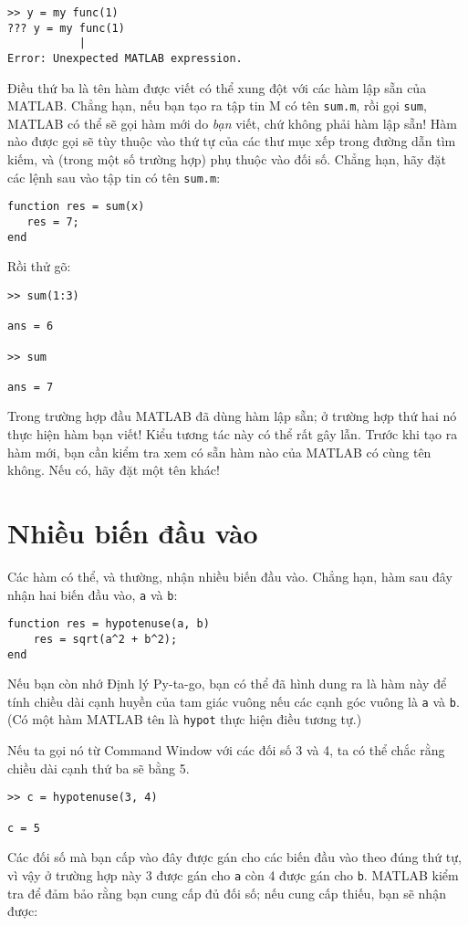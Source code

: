 \documentclass[12pt]{book}
\begin{document}
\begin{verbatim}
>> y = my func(1)
??? y = my func(1)
           |
Error: Unexpected MATLAB expression.
\end{verbatim}

Điều thứ ba là tên hàm được viết có thể xung đột với các hàm lập sẵn
của MATLAB. Chẳng hạn, nếu bạn tạo ra tập tin M có tên {\tt sum.m}, 
rồi gọi {\tt sum}, MATLAB có thể sẽ gọi hàm mới do {\em bạn} viết,
chứ không phải hàm lập sẵn! Hàm nào được gọi sẽ tùy thuộc vào thứ tự
của các thư mục xếp trong đường dẫn tìm kiếm, và (trong một số
trường hợp) phụ thuộc vào đối số. Chẳng hạn, hãy đặt các lệnh sau
vào tập tin có tên {\tt sum.m}:

\begin{verbatim}
function res = sum(x)
   res = 7;
end
\end{verbatim}

Rồi thử gõ:

\begin{verbatim}
>> sum(1:3)

ans = 6

>> sum

ans = 7
\end{verbatim}
%
Trong trường hợp đầu MATLAB đã dùng hàm lập sẵn; ở trường hợp 
thứ hai nó thực hiện hàm bạn viết! Kiểu tương tác này có thể 
rất gây lẫn. Trước khi tạo ra hàm mới, bạn cần kiểm tra xem
có sẵn hàm nào của MATLAB có cùng tên không. Nếu có, hãy đặt
một tên khác!


\section{Nhiều biến đầu vào}
\label{hypotenuse}

Các hàm có thể, và thường, nhận nhiều biến đầu vào. Chẳng hạn,
hàm sau đây nhận hai biến đầu vào, {\tt a} và {\tt b}:

\begin{verbatim}
function res = hypotenuse(a, b)
    res = sqrt(a^2 + b^2);
end
\end{verbatim}

Nếu bạn còn nhớ Định lý Py-ta-go, bạn có thể đã hình dung ra là
hàm này để tính chiều dài cạnh huyền của tam giác vuông nếu các
cạnh góc vuông là {\tt a} và {\tt b}.  (Có một hàm MATLAB tên là 
{\tt hypot} thực hiện điều tương tự.)

Nếu ta gọi nó từ Command Window với các đối số 3 và 4, ta có thể
chắc rằng chiều dài cạnh thứ ba sẽ bằng 5.

\begin{verbatim}
>> c = hypotenuse(3, 4)

c = 5
\end{verbatim}
Các đối số mà bạn cấp vào đây được gán cho các biến đầu vào theo
đúng thứ tự, vì vậy ở trường hợp này 3 được gán cho {\tt a} còn 4 
được gán cho {\tt b}.  MATLAB kiểm tra để đảm bảo rằng bạn cung
cấp đủ đối số; nếu cung cấp thiếu, bạn sẽ nhận được:
\end{document}
